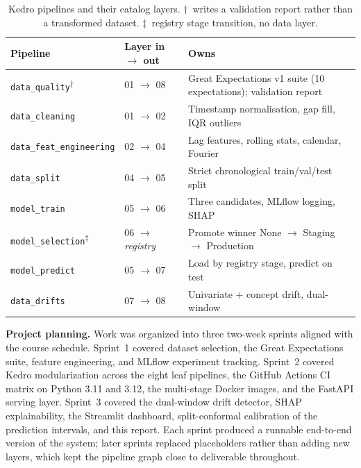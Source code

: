 \documentclass[11pt,a4paper]{article}
\newcommand{\code}[1]{\texttt{\small #1}}
\begin{document}
\begin{table}[H]
\centering
\small
\begin{tabularx}{\linewidth}{@{}l l X@{}}
\toprule
\textbf{Pipeline} & \textbf{Layer in $\rightarrow$ out} & \textbf{Owns} \\
\midrule
\code{data\_quality}\textsuperscript{$\dagger$}    & 01 $\rightarrow$ 08 & Great Expectations v1 suite (10 expectations); validation report \\
\code{data\_cleaning}          & 01 $\rightarrow$ 02 & Timestamp normalisation, gap fill, IQR outliers \\
\code{data\_feat\_engineering} & 02 $\rightarrow$ 04 & Lag features, rolling stats, calendar, Fourier \\
\code{data\_split}             & 04 $\rightarrow$ 05 & Strict chronological train/val/test split \\
\code{model\_train}            & 05 $\rightarrow$ 06 & Three candidates, MLflow logging, SHAP \\
\code{model\_selection}\textsuperscript{$\ddagger$} & 06 $\rightarrow$ \textit{registry} & Promote winner None $\to$ Staging $\to$ Production \\
\code{model\_predict}          & 05 $\rightarrow$ 07 & Load by registry stage, predict on test \\
\code{data\_drifts}            & 07 $\rightarrow$ 08 & Univariate + concept drift, dual-window \\
\bottomrule
\end{tabularx}
\caption{Kedro pipelines and their catalog layers. $\dagger$~writes a validation report rather than a transformed dataset. $\ddagger$~registry stage transition, no data layer.}
\label{tab:pipelines}
\end{table}

\textbf{Project planning.} Work was organized into three two-week sprints aligned with the course schedule. Sprint~1 covered dataset selection, the Great Expectations suite, feature engineering, and MLflow experiment tracking. Sprint~2 covered Kedro modularization across the eight leaf pipelines, the GitHub Actions CI matrix on Python 3.11 and 3.12, the multi-stage Docker images, and the FastAPI serving layer. Sprint~3 covered the dual-window drift detector, SHAP explainability, the Streamlit dashboard, split-conformal calibration of the prediction intervals, and this report. Each sprint produced a runnable end-to-end version of the system; later sprints replaced placeholders rather than adding new layers, which kept the pipeline graph close to deliverable throughout.
\end{document}
